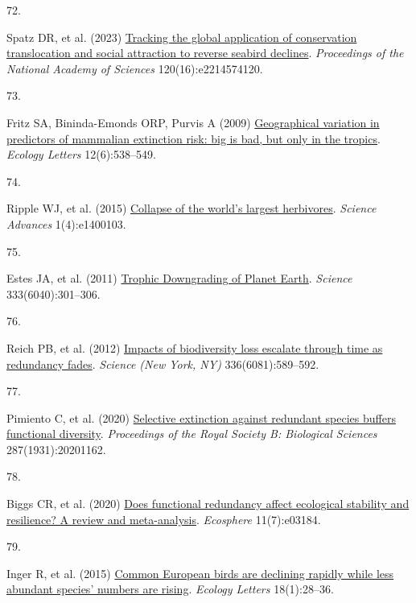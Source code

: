 \documentclass{article}
\newlength{\cslhangindent}
\newlength{\csllabelwidth}
\newlength{\cslentryspacingunit} %
\newenvironment{CSLReferences}[2] %
 {%
  \setlength{\parindent}{0pt}
  \ifodd #1
  \let\oldpar\par
  \def\par{\hangindent=\cslhangindent\oldpar}
  \fi
  \setlength{\parskip}{#2\cslentryspacingunit}
 }%
 {}
\newcommand{\CSLLeftMargin}[1]{\parbox[t]{\csllabelwidth}{#1}}
\newcommand{\CSLRightInline}[1]{\parbox[t]{\linewidth - \csllabelwidth}{#1}\break}
\begin{document}
\begin{CSLReferences}{0}{0}
\leavevmode{}%
\CSLLeftMargin{72. }%
\CSLRightInline{Spatz DR, et al. (2023)
\href{https://doi.org/10.1073/pnas.2214574120}{Tracking the global
application of conservation translocation and social attraction to
reverse seabird declines}. \emph{Proceedings of the National Academy of
Sciences} 120(16):e2214574120.}

\leavevmode{}%
\CSLLeftMargin{73. }%
\CSLRightInline{Fritz SA, Bininda-Emonds ORP, Purvis A (2009)
\href{https://doi.org/10.1111/j.1461-0248.2009.01307.x}{Geographical
variation in predictors of mammalian extinction risk: big is bad, but
only in the tropics}. \emph{Ecology Letters} 12(6):538--549.}

\leavevmode{}%
\CSLLeftMargin{74. }%
\CSLRightInline{Ripple WJ, et al. (2015)
\href{https://doi.org/10.1126/sciadv.1400103}{Collapse of the world{'}s
largest herbivores}. \emph{Science Advances} 1(4):e1400103.}

\leavevmode{}%
\CSLLeftMargin{75. }%
\CSLRightInline{Estes JA, et al. (2011)
\href{https://doi.org/10.1126/science.1205106}{Trophic Downgrading of
Planet Earth}. \emph{Science} 333(6040):301--306.}

\leavevmode{}%
\CSLLeftMargin{76. }%
\CSLRightInline{Reich PB, et al. (2012)
\href{https://doi.org/10.1126/science.1217909}{Impacts of biodiversity
loss escalate through time as redundancy fades}. \emph{Science (New
York, NY)} 336(6081):589--592.}

\leavevmode{}%
\CSLLeftMargin{77. }%
\CSLRightInline{Pimiento C, et al. (2020)
\href{https://doi.org/10.1098/rspb.2020.1162}{Selective extinction
against redundant species buffers functional diversity}.
\emph{Proceedings of the Royal Society B: Biological Sciences}
287(1931):20201162.}

\leavevmode{}%
\CSLLeftMargin{78. }%
\CSLRightInline{Biggs CR, et al. (2020)
\href{https://doi.org/10.1002/ecs2.3184}{Does functional redundancy
affect ecological stability and resilience? A review and meta-analysis}.
\emph{Ecosphere} 11(7):e03184.}

\leavevmode{}%
\CSLLeftMargin{79. }%
\CSLRightInline{Inger R, et al. (2015)
\href{https://doi.org/10.1111/ele.12387}{Common European birds are
declining rapidly while less abundant species' numbers are rising}.
\emph{Ecology Letters} 18(1):28--36.}


\end{CSLReferences}
\end{document}
